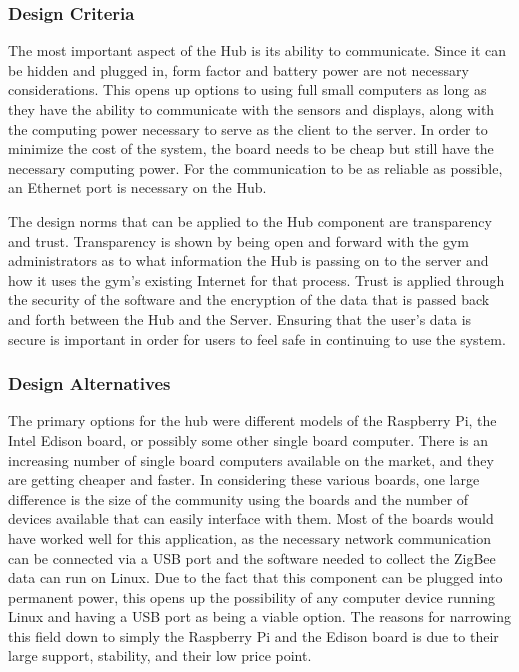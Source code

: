 \documentclass[PPFS.tex]{template/subfiles}
\begin{document}
\subsubsection{Design Criteria}
The most important aspect of the Hub is its ability to communicate. Since it can be hidden and plugged in, form factor and battery power are not necessary considerations. This opens up options to using full small computers as long as they have the ability to communicate with the sensors and displays, along with the computing power necessary to serve as the client to the server. In order to minimize the cost of the system, the board needs to be cheap but still have the necessary computing power. For the communication to be as reliable as possible, an Ethernet port is necessary on the Hub.

The design norms that can be applied to the Hub component are transparency and trust. Transparency is shown by being open and forward with the gym administrators as to what information the Hub is passing on to the server and how it uses the gym's existing Internet for that process. Trust is applied through the security of the software and the encryption of the data that is passed back and forth between the Hub and the Server. Ensuring that the user's data is secure is important in order for users to feel safe in continuing to use the system.

\subsubsection{Design Alternatives}
The primary options for the hub were different models of the Raspberry Pi, the Intel Edison board, or possibly some other single board computer. There is an increasing number of single board computers available on the market, and they are getting cheaper and faster. In considering these various boards, one large difference is the size of the community using the boards and the number of devices available that can easily interface with them. Most of the boards would have worked well for this application, as the necessary network communication can be connected via a USB port and the software needed to collect the ZigBee data can run on Linux. Due to the fact that this component can be plugged into permanent power, this opens up the possibility of any computer device running Linux and having a USB port as being a viable option. The reasons for narrowing this field down to simply the Raspberry Pi and the Edison board is due to their large support, stability, and their low price point.
\end{document}
